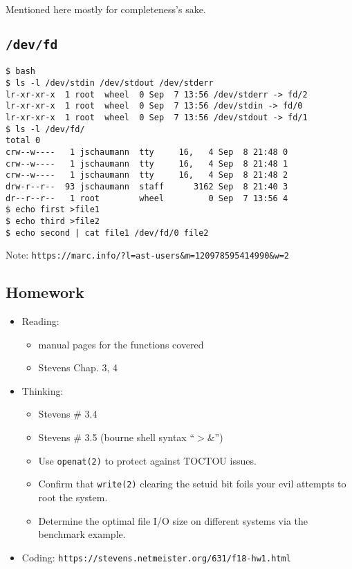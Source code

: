 \documentclass[xga]{xdvislides}
\begin{document}
Mentioned here mostly for completeness's sake.

\subsection{{\tt /dev/fd}}
\begin{verbatim}
$ bash
$ ls -l /dev/stdin /dev/stdout /dev/stderr
lr-xr-xr-x  1 root  wheel  0 Sep  7 13:56 /dev/stderr -> fd/2
lr-xr-xr-x  1 root  wheel  0 Sep  7 13:56 /dev/stdin -> fd/0
lr-xr-xr-x  1 root  wheel  0 Sep  7 13:56 /dev/stdout -> fd/1
$ ls -l /dev/fd/
total 0
crw--w----   1 jschaumann  tty     16,   4 Sep  8 21:48 0
crw--w----   1 jschaumann  tty     16,   4 Sep  8 21:48 1
crw--w----   1 jschaumann  tty     16,   4 Sep  8 21:48 2
drw-r--r--  93 jschaumann  staff      3162 Sep  8 21:40 3
dr--r--r--   1 root        wheel         0 Sep  7 13:56 4
$ echo first >file1
$ echo third >file2
$ echo second | cat file1 /dev/fd/0 file2
\end{verbatim}

Note:
{\tt https://marc.info/?l=ast-users\&m=120978595414990\&w=2}


\subsection{Homework}
\begin{itemize}
	\item Reading:
		\begin{itemize}
			\item manual pages for the functions covered
			\item Stevens Chap. 3, 4
		\end{itemize}
	\item Thinking:
		\begin{itemize}
			\item Stevens \# 3.4
			\item Stevens \# 3.5 (bourne shell syntax ``$>\&$'')
			\item Use {\tt openat(2)} to protect against TOCTOU issues.
			\item Confirm that {\tt write(2)} clearing the setuid bit foils your evil attempts to root the system.
			\item Determine the optimal file I/O size on different systems via the benchmark example.
		\end{itemize}
	\item Coding:
		{\tt https://stevens.netmeister.org/631/f18-hw1.html}
\end{itemize}
\end{document}
